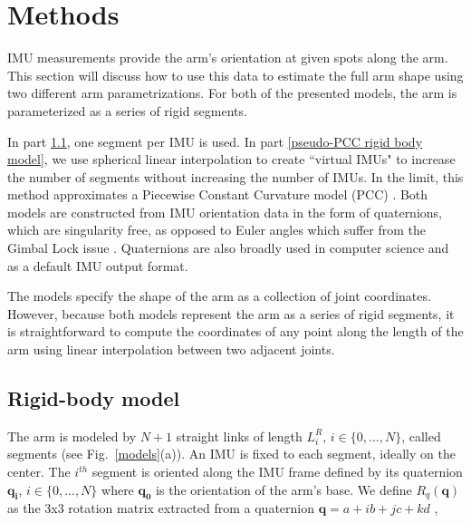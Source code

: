 \section{Methods}   \label{sec:methods}

IMU measurements provide the arm's orientation at given spots along the arm. 
This section will discuss how to use this data  to estimate the full arm shape using two different arm parametrizations.
For both of the presented models, the arm is parameterized as a series of rigid segments. 

In part \ref{rigid body model}, one segment per IMU is used. 
In part \ref{pseudo-PCC rigid body model}, we use spherical linear interpolation to create ``virtual IMUs" to increase the number of segments without increasing the number of IMUs. 
In the limit, this method approximates a Piecewise Constant Curvature model (PCC) \cite{webster2010_pcc}. Both models are constructed from IMU orientation data in the form of quaternions, which are singularity free, as opposed to Euler angles which suffer from the Gimbal Lock issue \cite{doi:10.1177/003754976500400610}.
Quaternions are also broadly used in computer science and as a default IMU output format.

The models specify the shape of the arm as a collection of joint coordinates.
However, because both models represent the arm as a series of rigid segments, it is straightforward to compute the coordinates of any point along the length of the arm using linear interpolation between two adjacent joints.

\subsection{Rigid-body model} \label{rigid body model}
The arm is modeled by $N+1$ straight links of length $L^R_i \text{, } i \in \{0,...,N\}$, called segments (see Fig.~\ref{models}(a)). 
An IMU is fixed to each segment, ideally on the center.
The $i^{th}$ segment is oriented along the IMU frame defined by its quaternion $\mathbf{q_i}$, $i \in \{0,...,N\}$ where
$\mathbf{q_0}$ is the orientation of the arm's base.
We define $R_q(\mathbf{q})$ as the 3x3 rotation matrix extracted from a quaternion $\mathbf{q} = a + i b + j c + k d$ \cite{tf_lib_ROS},

